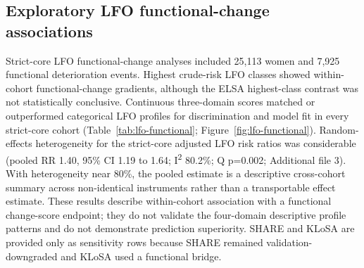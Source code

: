 \documentclass[pdflatex,sn-vancouver-num]{sn-jnl}
\begin{document}
\FloatBarrier

\subsection{Exploratory LFO functional-change associations}

Strict-core LFO functional-change analyses included 25,113 women and 7,925 functional deterioration events. Highest crude-risk LFO classes showed within-cohort functional-change gradients, although the ELSA highest-class contrast was not statistically conclusive. Continuous three-domain scores matched or outperformed categorical LFO profiles for discrimination and model fit in every strict-core cohort (Table~\ref{tab:lfo-functional}; Figure~\ref{fig:lfo-functional}). Random-effects heterogeneity for the strict-core adjusted LFO risk ratios was considerable (pooled RR 1.40, 95\% CI 1.19 to 1.64; I\textsuperscript{2} 80.2\%; Q p=0.002; Additional file 3). With heterogeneity near 80\%, the pooled estimate is a descriptive cross-cohort summary across non-identical instruments rather than a transportable effect estimate. These results describe within-cohort association with a functional change-score endpoint; they do not validate the four-domain descriptive profile patterns and do not demonstrate prediction superiority. SHARE and KLoSA are provided only as sensitivity rows because SHARE remained validation-downgraded and KLoSA used a functional bridge.
\end{document}
